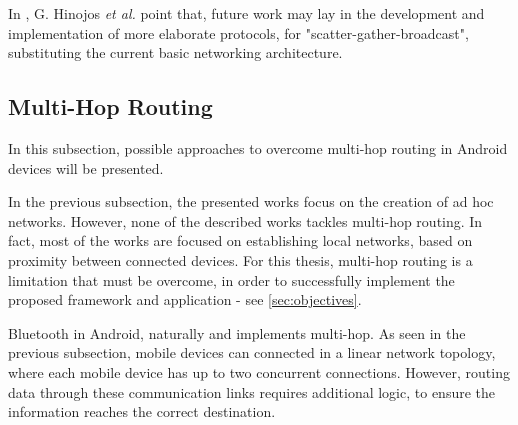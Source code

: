 In \cite{bluehoc}, G. Hinojos \textit{et al.} point that, future work may lay in the development and implementation of more elaborate protocols, for "scatter-gather-broadcast", substituting the current basic networking architecture.

\subsection{Multi-Hop Routing}

In this subsection, possible approaches to overcome multi-hop routing in Android devices will be presented.

In the previous subsection, the presented works focus on the creation of ad hoc networks. However, none of the described works tackles multi-hop routing. In fact, most of the works are focused on establishing local networks, based on proximity between connected devices. For this thesis, multi-hop routing is a limitation that must be overcome, in order to successfully implement the proposed framework and application - see \ref{sec:objectives}.

Bluetooth in Android, naturally and implements multi-hop. As seen in the previous subsection, mobile devices can connected in a linear network topology, where each mobile device has up to two concurrent connections. However, routing data through these communication links requires additional logic, to ensure the information reaches the correct destination.






